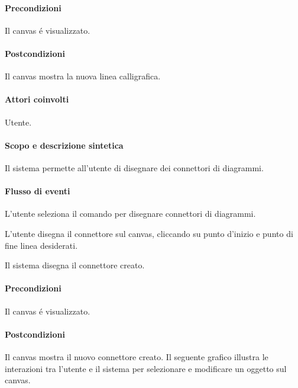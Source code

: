 \paragraph{Precondizioni} Il canvas \'e visualizzato.
\paragraph{Postcondizioni} Il canvas mostra la nuova linea calligrafica.

\paragraph{Attori coinvolti} Utente.
\paragraph{Scopo e descrizione sintetica} 
Il sistema permette all'utente di disegnare dei connettori di diagrammi.
\paragraph{Flusso di eventi}
\begin{elenconumerato}[\textbf{}]{\subsubsecindent}
\item L'utente seleziona il comando per disegnare connettori di diagrammi.
\item L'utente disegna il connettore sul canvas, cliccando su punto d'inizio e punto di fine linea desiderati.
\item Il sistema disegna il connettore creato.
\end{elenconumerato}
\paragraph{Precondizioni} Il canvas \'e visualizzato.
\paragraph{Postcondizioni} Il canvas mostra il nuovo connettore creato.
\newpage
{}
\label{ucselezionaemodifica}
Il seguente grafico illustra le interazioni tra l'utente e il sistema per selezionare e modificare un oggetto sul canvas.


